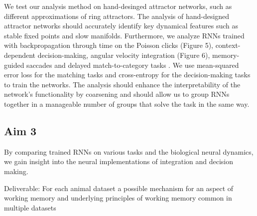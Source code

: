 \documentclass[12pt,letterpaper, onecolumn]{article}
\theoremstyle{definition}
\theoremstyle{remark}
\begin{document}
We test our analysis method on hand-desinged attractor networks, such as different approximations of ring attractors.
The analysis of hand-designed attractor networks should accurately identify key dynamical features such as stable fixed points and slow manifolds.
%
Furthermore, we analyze RNNs trained with backpropagation through time on the Poisson clicks (Figure 5), context-dependent decision-making, angular velocity integration (Figure 6), memory-guided saccades  and delayed match-to-category tasks \citep{schuessler2020}. %
We use mean-squared error loss for the matching tasks and cross-entropy for the decision-making tasks to train the networks.
The analysis should enhance the interpretability of the network's functionality by coarsening and should allow us to group RNNs together in a manageable number of groups that solve the task in the same way.





%
%






\newpage

\subsection*{Aim 3}

By comparing trained RNNs on various tasks and the biological neural dynamics, we gain insight into the neural implementations of integration and decision making.


\noindent
Deliverable: For each animal dataset a possible mechanism for an aspect of working memory and underlying principles of working memory common in multiple datasets
\end{document}
